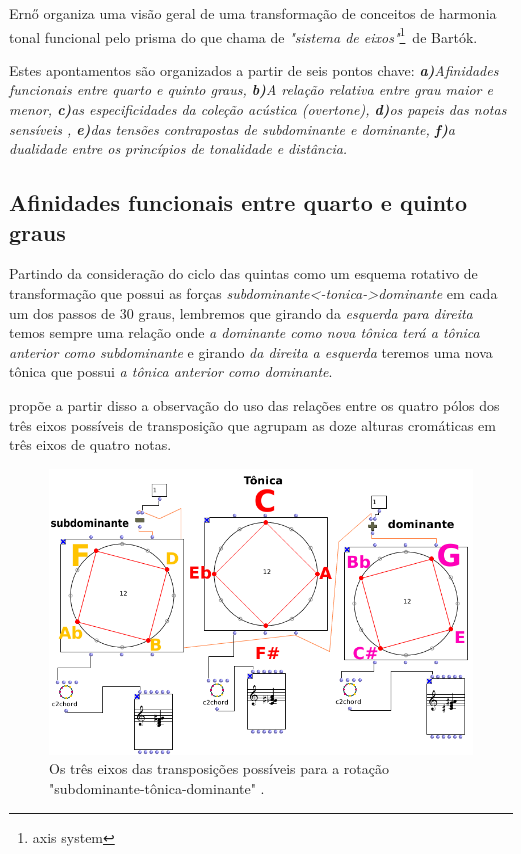 \documentclass[
	12pt,				%
	openright,			%
	twoside,			%
	a4paper,			%
	english,			%
	french,				%
	spanish,			%
	brazil				%
	]{abntex2}
\begin{document}
Ern{\H{o}}  organiza uma visão geral de uma transformação de conceitos de harmonia tonal funcional pelo prisma do que chama de \textit{"sistema de eixos"}\footnote{axis system}\ de Bartók. \pagebreak

Estes apontamentos são organizados a partir de seis pontos chave: \textit{\textbf{a)}Afinidades funcionais entre quarto e quinto graus,\textbf{ b)}A relação relativa entre grau maior e menor, \textbf{c)}as especificidades da coleção acústica (overtone), \textbf{d)}os papeis das notas sensíveis , \textbf{e)}das tensões contrapostas de subdominante e dominante, \textbf{f)}a dualidade entre os princípios de tonalidade e distância.}

\subsection{Afinidades funcionais entre quarto e quinto graus}

Partindo da consideração do ciclo das quintas como um esquema rotativo de transformação que possui as forças \textit{subdominante<-tonica->dominante} em cada um dos passos de 30 graus, lembremos que girando da \textit{esquerda para direita} temos sempre uma relação onde \textit{a dominante como nova tônica terá a tônica anterior como subdominante} e girando \textit{da direita a esquerda} teremos uma nova tônica que possui \textit{a tônica anterior como dominante}. 

 propõe a partir disso a observação do uso das relações entre os quatro pólos dos três eixos possíveis de transposição que agrupam as doze alturas cromáticas em três eixos de quatro notas. 

\begin{figure}[!h]
	\caption{\label{fig_grafico}Os três eixos das transposições possíveis para a rotação "subdominante-tônica-dominante" .}
	\begin{center}
	    \includegraphics[scale=0.6]{axis/axisOM.png}
	\end{center}
\end{figure}
\end{document}

